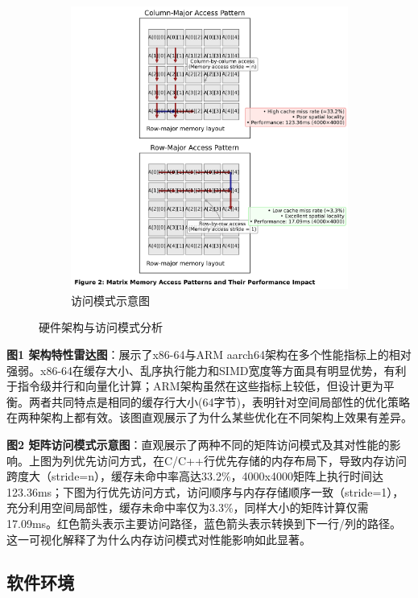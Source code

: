 \documentclass[a4paper,colorlinks=true,linkcolor=blue,urlcolor=blue,citecolor=green,bookmarks=true]{article}
\begin{document}
\begin{figure}[htbp]
\begin{subfigure}[b]{0.48\textwidth}
    \includegraphics[width=\textwidth]{access_patterns_diagram.png}
    \caption{访问模式示意图}
    \label{fig:access_patterns}
  \end{subfigure}
  \caption{硬件架构与访问模式分析}
  \label{fig:hardware_access}
\end{figure}

\textbf{图1 架构特性雷达图}：展示了x86-64与ARM aarch64架构在多个性能指标上的相对强弱。x86-64在缓存大小、乱序执行能力和SIMD宽度等方面具有明显优势，有利于指令级并行和向量化计算；ARM架构虽然在这些指标上较低，但设计更为平衡。两者共同特点是相同的缓存行大小(64字节)，表明针对空间局部性的优化策略在两种架构上都有效。该图直观展示了为什么某些优化在不同架构上效果有差异。

\textbf{图2 矩阵访问模式示意图}：直观展示了两种不同的矩阵访问模式及其对性能的影响。上图为列优先访问方式，在C/C++行优先存储的内存布局下，导致内存访问跨度大（stride=n），缓存未命中率高达33.2\%，4000x4000矩阵上执行时间达123.36ms；下图为行优先访问方式，访问顺序与内存存储顺序一致（stride=1），充分利用空间局部性，缓存未命中率仅为3.3\%，同样大小的矩阵计算仅需17.09ms。红色箭头表示主要访问路径，蓝色箭头表示转换到下一行/列的路径。这一可视化解释了为什么内存访问模式对性能影响如此显著。

\subsection{软件环境}
\end{document}
